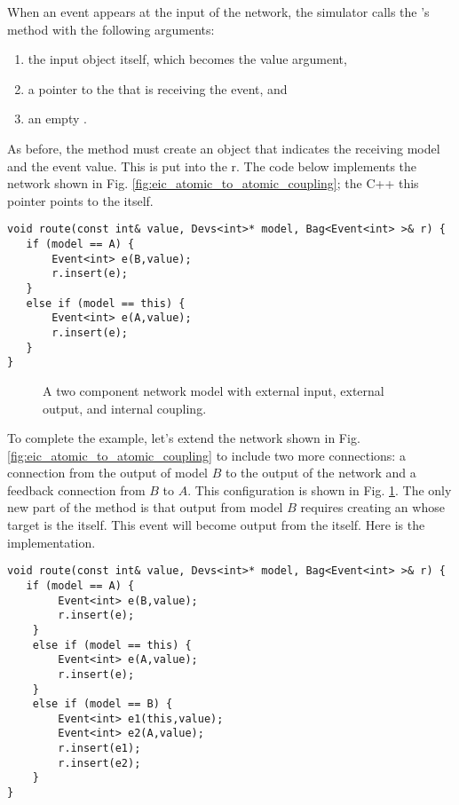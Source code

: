 When an event appears at the input of the network, the simulator calls the 's  method with the following arguments:
\begin{enumerate}
\item the input object itself, which becomes the value argument,
\item a pointer to the  that is receiving the event, and
\item an empty .
\end{enumerate} 
As before, the  method must create an  object that indicates the receiving model and the event value. This  is put into the  r. The code below implements the network shown in Fig. \ref{fig:eic_atomic_to_atomic_coupling}; the C++ this pointer points to the  itself.
\begin{verbatim}
void route(const int& value, Devs<int>* model, Bag<Event<int> >& r) {
   if (model == A) {
       Event<int> e(B,value);
       r.insert(e);
   }
   else if (model == this) {
       Event<int> e(A,value);
       r.insert(e);
   }
}
\end{verbatim}

\begin{figure}[ht]
\centering
{}
\caption{A two component network model with external input, external output, and internal coupling.}
\label{fig:big_coupling}
\end{figure} 
To complete the example, let's extend the network shown in Fig. \ref{fig:eic_atomic_to_atomic_coupling} to include two more connections: a connection from the output of model $B$ to the output of the network and a feedback connection from $B$ to $A$. This configuration is shown in Fig. \ref{fig:big_coupling}. The only new part of the  method is that output from model $B$ requires creating an  whose target is the  itself. This event will become output from the  itself.
Here is the implementation.
\begin{verbatim}
void route(const int& value, Devs<int>* model, Bag<Event<int> >& r) {
   if (model == A) {
        Event<int> e(B,value);
        r.insert(e);
    }
    else if (model == this) {
        Event<int> e(A,value);
        r.insert(e);
    }
    else if (model == B) {
        Event<int> e1(this,value);
        Event<int> e2(A,value);
        r.insert(e1);
        r.insert(e2);
    }
}
\end{verbatim}

